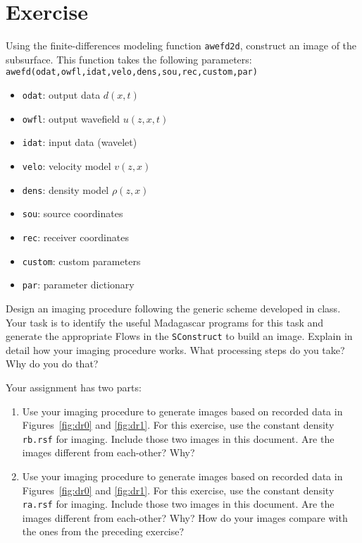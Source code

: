 \section{Exercise}

Using the finite-differences modeling function \texttt{awefd2d},
construct an image of the subsurface. This function takes the
following parameters: \\
\texttt{awefd(odat,owfl,idat,velo,dens,sou,rec,custom,par)}
\begin{itemize}
\item \texttt{odat}: output data $d\left( x,t \right)$
\item \texttt{owfl}: output wavefield $u \left( z,x,t \right)$
\item \texttt{idat}: input data (wavelet)
\item \texttt{velo}: velocity model $v \left( z,x \right)$
\item \texttt{dens}: density model $\rho \left( z,x \right)$
\item \texttt{sou}: source coordinates
\item \texttt{rec}: receiver coordinates
\item \texttt{custom}: custom parameters
\item\texttt{par}: parameter dictionary
\end{itemize}

Design an imaging procedure following the generic scheme developed in
class. Your task is to identify the useful Madagascar programs for
this task and generate the appropriate Flows in the
\texttt{SConstruct} to build an image. Explain in detail how your 
imaging procedure works. What processing steps do you take? Why do you
do that?

Your assignment has two parts:
\begin{enumerate}
\item 
Use your imaging procedure to generate images based on recorded data
in Figures~\ref{fig:dr0} and \ref{fig:dr1}. For this exercise, use the
constant density \texttt{rb.rsf} for imaging. Include those two images
in this document. Are the images different from each-other? Why?

\item
Use your imaging procedure to generate images based on recorded data
in Figures~\ref{fig:dr0} and \ref{fig:dr1}. For this exercise, use the
constant density \texttt{ra.rsf} for imaging. Include those two images
in this document. Are the images different from each-other? Why? How
do your images compare with the ones from the preceding exercise?

\end{enumerate}

